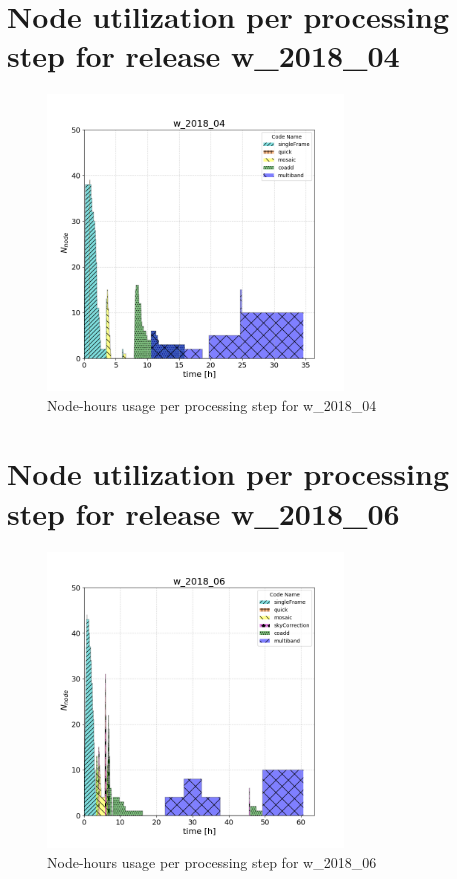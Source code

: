 \section{Node utilization per processing step for release w\_2018\_04}

\begin{figure}[h]
  \centering
  \includegraphics[width=0.70\textwidth]{figures/usage-w_2018_04-ultimate.png}
  \caption{Node-hours usage per processing step for w\_2018\_04}
  \label{fig:PerTask04}
\end{figure}


\clearpage
\section{Node utilization per processing step for release w\_2018\_06}

\begin{figure}[h]
  \centering
  \includegraphics[width=0.70\textwidth]{figures/usage-w_2018_06-ultimate.png}
  \caption{Node-hours usage per processing step for w\_2018\_06}
  \label{fig:PerTask06}
\end{figure}


